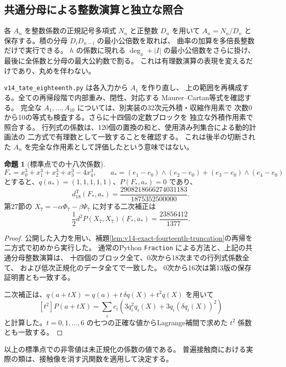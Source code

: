 \documentclass[a4paper,11pt]{ltjsarticle}
\theoremstyle{definition}
\newtheorem{proposition}[theorem]{命題}
\begin{document}
\subsection{共通分母による整数演算と独立な照合}

各 $A_n$ を整数係数の正規記号多項式 $N_n$ と正整数 $D_n$ を用いて
$A_n=N_n/D_n$ と保存する。積の分母 $D_iD_{n-i}$ の最小公倍数を取れば、
曲率の加算を多倍長整数だけで実行できる。
$h$ の係数に現れる $\deg_x+|I|$ の最小公倍数をさらに掛け、
最後に全係数と分母の最大公約数で割る。
これは有理数演算の表現を変えるだけであり、丸めを伴わない。

\texttt{v14\_tate\_eighteenth.py} は各入力から $A_1$ を作り直し、
上の範囲を再構成する。全ての再帰段階で内部重み、閉性、対応する
Maurer--Cartan等式を確認する。
完全な $A_1,\ldots,A_{10}$ については、別実装の32次元外積・収縮作用素で
次数0から10の等式も検査する。さらに十四個の定数ブロックを
独立な外積作用素で照合する。
行列式の係数は、120個の置換の和と、使用済み列集合による動的計画法の
二方式で有理数として一致することを確認する。
これは後半の切断された $A_n$ を完全な作用素として評価したという意味ではない。

\begin{proposition}[標準点での十八次係数]
\label{prop:v14-standard-eighteenth-value}
\[
 F_*=x_0^3+x_1^3+x_2^3+x_3^3-4x_4^3,
 \qquad
 a_*=(e_1-e_0)\wedge(e_2-e_0)
       +(e_3-e_0)\wedge(e_4-e_0)
\]
とすると、$q(a_*)=(1,1,1,1,1)$、$P(F_*,a_*)=0$ であり、
\[
 d^{\mathrm T}_{18}(F_*,a_*)
     =\frac{2908218666274031183}{1875352500000}.
\]
第27節の $X_7=-\alpha\Phi_7-\beta\Psi_7$ に対する二次補正は
\[
 \frac12d^2P(X_7,X_7)(F_*,a_*)=\frac{23856412}{1377}.
\]
\end{proposition}

\begin{proof}
公開した入力を用い、補題\ref{lem:v14-exact-fourteenth-truncation}の再帰を
二方式で初めから実行した。
通常のPython \texttt{Fraction} による方法と、上記の共通分母整数演算は、
十四個のブロック全て、0次から18次までの行列式係数全て、
および低次正規化のデータ全てで一致した。
0次から16次は第13版の保存証明書とも一致する。

二次補正は、$q(a+tX)=q(a)+t\,\delta q(X)+t^2q(X)$ を用いて
\[
 [t^2]P(a+tX)
  =\sum_i c_i\left(3q_i^2q_i(X)+3q_i(\delta q_i(X))^2\right)
\]
と計算した。$t=0,1,\ldots,6$ の七つの正確な値からLagrange補間で求めた
$t^2$ 係数とも一致する。
\end{proof}

以上の標準点での非零値は未正規化の係数の値である。
普遍接触商における実際の類は、接触像を消す汎関数を適用して決定する。
\end{document}
